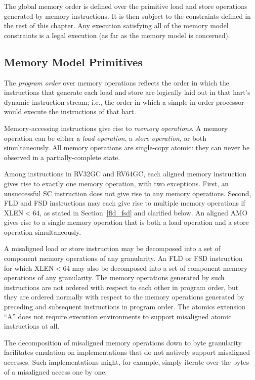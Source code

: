 The global memory order is defined over the primitive load and store operations generated by memory instructions.
It is then subject to the constraints defined in the rest of this chapter.
Any execution satisfying all of the memory model constraints is a legal execution (as far as the memory model is concerned).

\subsection*{Memory Model Primitives}
\label{sec:rvwmo:primitives}
The {\em program order} over memory operations reflects the order in which the instructions that generate each load and store are logically laid out in that hart's dynamic instruction stream; i.e., the order in which a simple in-order processor would execute the instructions of that hart.

Memory-accessing instructions give rise to {\em memory operations}.
A memory operation can be either a {\em load operation}, a {\em store operation}, or both simultaneously.
All memory operations are single-copy atomic: they can never be observed in a partially-complete state.

Among instructions in RV32GC and RV64GC, each aligned memory instruction gives rise to exactly one memory operation, with two exceptions.
First, an unsuccessful SC instruction does not give rise to any memory operations.
Second, FLD and FSD instructions may each give rise to multiple memory operations if XLEN$<$64, as stated in Section~\ref{fld_fsd} and clarified below.
An aligned AMO gives rise to a single memory operation that is both a load operation and a store operation simultaneously.

A misaligned load or store instruction may be decomposed into a set of component memory operations of any granularity.
An FLD or FSD instruction for which XLEN$<$64 may also be decomposed into a set of component memory operations of any granularity.
The memory operations generated by such instructions are not ordered with respect to each other in program order, but they are ordered normally with respect to the memory operations generated by preceding and subsequent instructions in program order.
The atomics extension ``A'' does not require execution environments to support misaligned atomic instructions at all.

\begin{commentary}
  The decomposition of misaligned memory operations down to byte granularity facilitates emulation on implementations that do not natively support misaligned accesses.
  Such implementations might, for example, simply iterate over the bytes of a misaligned access one by one.
\end{commentary}

